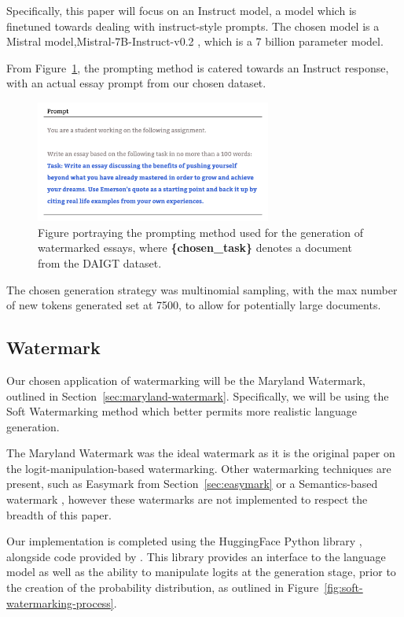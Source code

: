 \documentclass{l4proj}
\theoremstyle{definition}
\newcommand{\codefont}[1]{{\fontfamily{qcr}\selectfont #1}}
\begin{document}
        Specifically, this paper will focus on an Instruct model, a model which is finetuned towards dealing with instruct-style prompts. The chosen model is a Mistral model,\codefont{Mistral-7B-Instruct-v0.2} \citep{jiang2023mistral}, which is a 7 billion parameter model.

        From Figure~\ref{fig:prompting-method}, the prompting method is catered towards an Instruct response, with an actual essay prompt from our chosen dataset.
        
        \begin{figure}[h]
            \centering
            \includegraphics[height=4cm, width=1\linewidth, keepaspectratio]{images/methods/prompt-template.pdf}
            \caption{Figure portraying the prompting method used for the generation of watermarked essays, where \textbf{\{chosen\_task\}} denotes a document from the DAIGT dataset.}
            \label{fig:prompting-method}
        \end{figure}

        The chosen generation strategy was multinomial sampling, with the max number of new tokens generated set at 7500, to allow for potentially large documents.
        
    \subsection{Watermark}    
        Our chosen application of watermarking will be the Maryland Watermark, outlined in Section~\ref{sec:maryland-watermark}. Specifically, we will be using the Soft Watermarking method which better permits more realistic language generation. 

        The Maryland Watermark was the ideal watermark as it is the original paper on the logit-manipulation-based watermarking. Other watermarking techniques are present, such as Easymark from Section~\ref{sec:easymark} or a Semantics-based watermark \citep{hou2024ksemstamp}, however these watermarks are not implemented to respect the breadth of this paper. 

        Our implementation is completed using the HuggingFace Python library \citep{wolf-etal-2020-transformers}, alongside code provided by \citet{kirchenbauer2023watermark}. This library provides an interface to the language model as well as the ability to manipulate logits at the generation stage, prior to the creation of the probability distribution, as outlined in Figure~\ref{fig:soft-watermarking-process}. 
\end{document}
